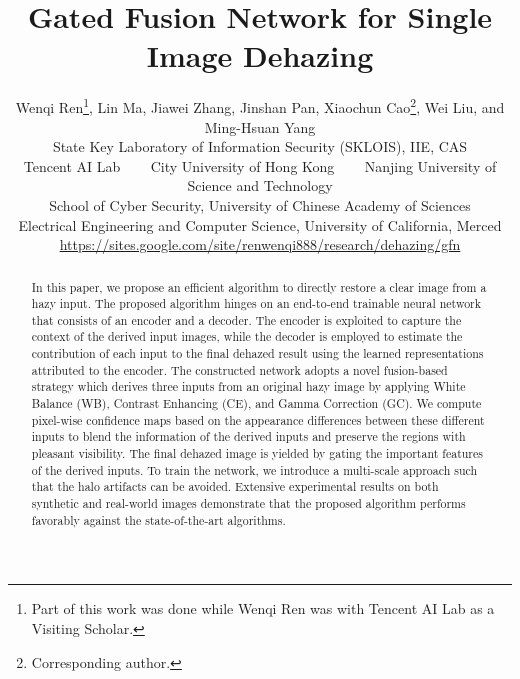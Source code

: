 \documentclass[10pt,twocolumn,letterpaper]{article}
\begin{document}
\title{Gated Fusion Network for Single Image Dehazing}

\author{Wenqi Ren\thanks{Part of this work was done while Wenqi Ren was with Tencent AI Lab as a Visiting Scholar.}, Lin Ma, Jiawei Zhang, Jinshan Pan, Xiaochun Cao\thanks{Corresponding author.}, Wei Liu, and Ming-Hsuan Yang\\
	State Key Laboratory of Information Security (SKLOIS), IIE, CAS\\
	Tencent AI Lab ~~~
	City University of Hong Kong ~~~
	Nanjing University of Science and Technology\\
	School of Cyber Security, University of Chinese Academy of Sciences\\
	Electrical Engineering and Computer Science, University of California, Merced\\
{\small\url{https://sites.google.com/site/renwenqi888/research/dehazing/gfn}}
}

\maketitle
\thispagestyle{empty}

\begin{abstract}
	In this paper, we propose an efficient algorithm to directly restore a clear image from a hazy input.
The proposed algorithm hinges on an end-to-end trainable neural network that consists of an encoder and a decoder. The encoder is exploited to capture the context of the derived input images,
	while the decoder is employed to estimate the contribution of each input to the final dehazed result using the learned representations attributed to the encoder.
The constructed network adopts a novel fusion-based strategy which derives three inputs from an original hazy image by applying White Balance (WB), Contrast Enhancing (CE), and Gamma Correction (GC).
	We compute pixel-wise confidence maps based on the appearance differences between these different inputs to blend the information of the derived inputs and preserve the regions with pleasant visibility.
	The final dehazed image is yielded by gating the important features of the derived inputs.
To train the network, we introduce a multi-scale approach such that the halo artifacts can be avoided.
Extensive experimental results on both synthetic and real-world images demonstrate that the proposed algorithm performs favorably against the state-of-the-art algorithms.
\end{abstract}

\vspace{-0.2cm}
\end{document}
